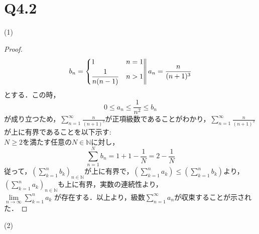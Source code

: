 \documentclass{jarticle}
\begin{document}
\section*{Q4.2}
(1)\\
\begin{proof}
\begin{equation}
	b_{n} = \left\{
		\begin{aligned}
			&1 &n=1& \\
			&\frac{1}{n(n-1)}& n>1&\\
		\end{aligned}
			\right\|
	\\
	\\
	\\
	a_{n}= \frac{n}{(n+1)^{3}}
\end{equation}
とする．この時，
$$
	0 \le a_n \le \frac{1}{n^2} \le b_n
$$
が成り立つため，$\sum\limits_{n=1}^{\infty} \frac{n}{(n+1)^3}$が正項級数であることがわかり，$\sum\limits_{n=1}^{\infty} \frac{n}{(n+1)^3}$が上に有界であることを以下示す:\\
$N \ge 2$を満たす任意の$N \in \mathbb{N}$に対し，
$$
	\sum_{n=1}^N b_n = 1+1-\frac{1}{N} =2-\frac{1}{N}
$$
従って，$(\sum\limits_{k=1}^n b_k)_{n \in \mathbb{N}}$が上に有界で，$(\sum\limits_{k=1}^n a_k) \le (\sum\limits_{k=1}^n b_k)$より，\\
$(\sum\limits_{k=1}^n a_k)_{n \in \mathbb{N}}$も上に有界，実数の連続性より，\\
$
	\lim\limits_{n \to \infty} \sum\limits_{k=1}^{n}a_{k}
$
	が存在する．以上より，級数$\sum\limits_{n=1}^{\infty} a_n$が収束することが示された．
\end{proof}
(2)\\
\end{document}
